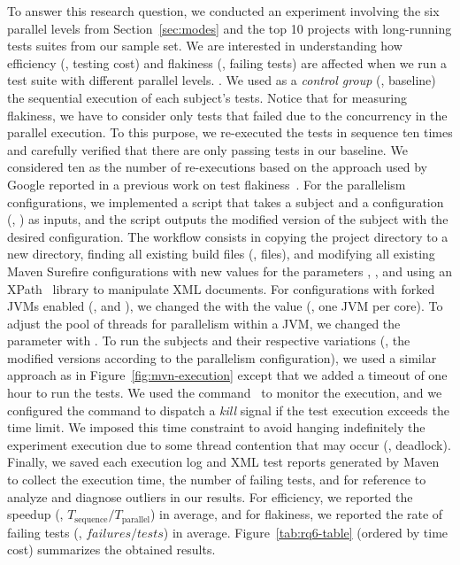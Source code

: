 To answer this research question, we conducted an experiment involving
the six parallel levels from Section~\ref{sec:modes}  and the top 10
projects with long-running tests suites from our sample set. We are
interested in understanding how efficiency (\ie, testing cost) and
flakiness (\ie, failing tests) are affected when we run a test suite
with different parallel levels. .  We used as
a \emph{control group} (\ie, baseline) the sequential execution of
each subject's tests. Notice that for measuring flakiness, we have to
consider only tests that failed due to the concurrency in the parallel
execution. To this purpose, we re-executed the tests in sequence ten
times and carefully verified that there are only passing tests in our
baseline. We considered ten as the number of re-executions based on
the approach used by Google reported in a previous work on test
flakiness~\cite{luo-etal-fse2014}. For the parallelism configurations,
we implemented a script that takes a subject and a configuration
(\eg, \ForkSeq{}) as inputs, and the script outputs the modified
version of the subject with the desired configuration. The workflow
consists in copying the project directory to a new directory, finding
all existing build files (\ie, \pomf{} files), and modifying all
existing Maven Surefire configurations with new values for the
parameters , , and
 using an XPath~\cite{xpath} library to manipulate
XML documents. For configurations with forked JVMs enabled (\ie,
\ForkSeq{} and \ForkParMeth{}), we changed the  with
the value  (\ie, one JVM per core). To adjust the pool of
threads for parallelism within a JVM, we changed the parameter
 with .  To run the subjects and their respective variations
(\ie, the modified versions according to the parallelism
configuration), we used a similar approach as in
Figure~\ref{fig:mvn-execution} except that we added a timeout of one
hour to run the tests. We used the 
command~\cite{timeout-cmd} to monitor the execution, and we configured
the command to dispatch a \emph{kill} signal if the test execution
exceeds the time limit. We imposed this time constraint to avoid
hanging indefinitely the experiment execution due to some thread
contention that may occur (\eg, deadlock). Finally, we saved each
execution log and XML test reports generated by Maven to collect the
execution time, the number of failing tests, and for reference to
analyze and diagnose outliers in our results. For efficiency, we
reported the speedup (\ie, $T_{\text{sequence}} /
T_{\text{parallel}}$) in average, and for flakiness, we reported the
rate of failing tests (\ie, $failures / tests$) in average.
Figure~\ref{tab:rq6-table} (ordered by time cost) summarizes the
obtained results.

